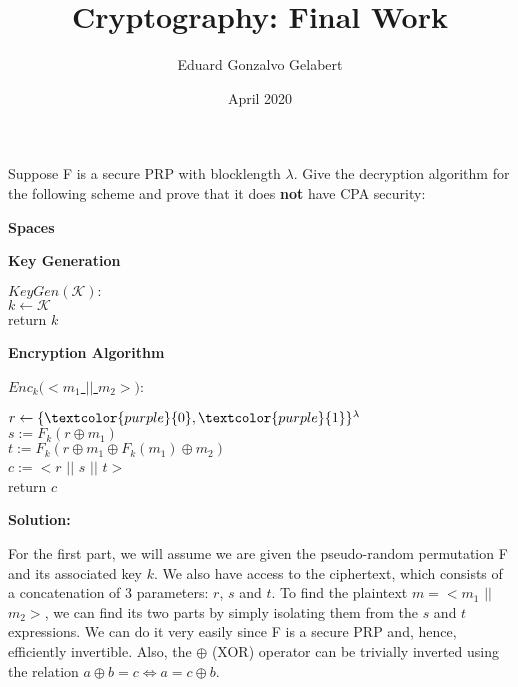 \documentclass{article}
\title{\huge Cryptography: Final Work}
\author{Eduard Gonzalvo Gelabert}
\date{April 2020}
\newcommand\tab[1][1cm]{\hspace*{#1}}
\begin{document}
\maketitle

Suppose F is a secure PRP with blocklength $\lambda$. Give the decryption algorithm for the following scheme and prove that it does \textbf{not} have CPA security:

\vspace{5pt}

\begin{tcolorbox}

\textbf{Spaces}


\vspace{5pt}

\textbf{Key Generation}

\tab[1cm] \underline{$KeyGen (\mathcal{K}):$}\\
\tab[1cm] $k \leftarrow \mathcal{K}$\\
\tab[1cm] return $k$

\vspace{5pt}

\textbf{Encryption Algorithm}

\tab \underline{$Enc_{k} (<m_1$ $\vert \vert$ $m_2>):$}

\tab[1cm] $r \leftarrow \{ \textcolor{purple}{0} , \textcolor{purple}{1} \}^\lambda$\\
\tab[1cm] $s := F_k (r \oplus m_1)$\\
\tab[1cm] $t := F_k (r \oplus m_1 \oplus F_k (m_1) \oplus m_2)$\\
\tab[1cm] $c := <r$ $\vert \vert$ $s$ $\vert \vert$ $t>$\\
\tab[1cm] return $c$

\end{tcolorbox}

\vspace{10pt}

\begin{center}
\textbf{\huge Solution:}
\end{center}

For the first part, we will assume we are given the pseudo-random permutation F and its associated key $k$. We also have access to the ciphertext, which consists of a concatenation of 3 parameters: $r$, $s$ and $t$. To find the plaintext $m = <m_1$ $\vert \vert$ $m_2>$, we can find its two parts by simply isolating them from the $s$ and $t$ expressions. We can do it very easily since F is a secure PRP and, hence, efficiently invertible. Also, the $\oplus$ (XOR) operator can be trivially inverted using the relation $a \oplus b = c 	\Leftrightarrow a = c \oplus b$.
\end{document}
